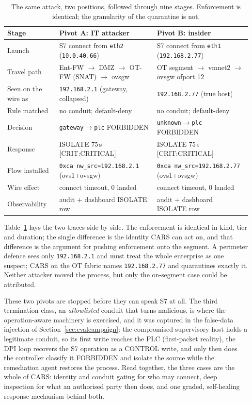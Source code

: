\begin{table}[t]
\centering
\small
\begin{tabular}{@{}p{3.1cm}p{5.0cm}p{5.0cm}@{}}
\hline
\textbf{Stage} & \textbf{Pivot A: IT attacker} & \textbf{Pivot B: insider} \\
\hline
Launch & S7 connect from \texttt{eth2} (\texttt{10.0.40.66}) & S7 connect from \texttt{eth1} (\texttt{192.168.2.77}) \\
Travel path & Ent-FW $\rightarrow$ DMZ $\rightarrow$ OT-FW (SNAT) $\rightarrow$ ovsgw & OT segment $\rightarrow$ vmnet2 $\rightarrow$ ovsgw ofport 12 \\
Seen on the wire as & \texttt{192.168.2.1} (gateway, collapsed) & \texttt{192.168.2.77} (true host) \\
Rule matched & no conduit; default-deny & no conduit; default-deny \\
Decision & \texttt{gateway$\rightarrow$plc} FORBIDDEN & \texttt{unknown$\rightarrow$plc} FORBIDDEN \\
Response & ISOLATE 75\,s [CRIT:CRITICAL] & ISOLATE 75\,s [CRIT:CRITICAL] \\
Flow installed & \texttt{0xca nw\_src=192.168.2.1} (ovs1+ovsgw) & \texttt{0xca nw\_src=192.168.2.77} (ovs1+ovsgw) \\
Wire effect & connect timeout, 0 landed & connect timeout, 0 landed \\
Observability & audit + dashboard ISOLATE row & audit + dashboard ISOLATE row \\
\hline
\end{tabular}
\caption[The same attack from two positions]{The same attack, two positions, followed through nine stages. Enforcement is identical; the granularity of the quarantine is not.}
\label{tab:eventtrail}
\end{table}

Table~\ref{tab:eventtrail} lays the two traces side by side. The enforcement is identical in kind, tier and duration; the single difference is the identity CARS can act on, and that difference is the argument for pushing enforcement onto the segment. A perimeter defence sees only \texttt{192.168.2.1} and must treat the whole enterprise as one suspect; CARS on the OT fabric names \texttt{192.168.2.77} and quarantines exactly it. Neither attacker moved the process, but only the on-segment case could be attributed.

These two pivots are stopped before they can speak S7 at all. The third termination class, an \emph{allowlisted} conduit that turns malicious, is where the operation-aware machinery is exercised, and it was captured in the false-data injection of Section~\ref{sec:evalcampaign}: the compromised supervisory host holds a legitimate conduit, so its first write reaches the PLC (first-packet reality), the DPI loop recovers the S7 operation as a CONTROL write, and only then does the controller classify it FORBIDDEN and isolate the source while the remediation agent restores the process. Read together, the three cases are the whole of CARS: identity and conduit gating for who may connect, deep inspection for what an authorised party then does, and one graded, self-healing response mechanism behind both.

